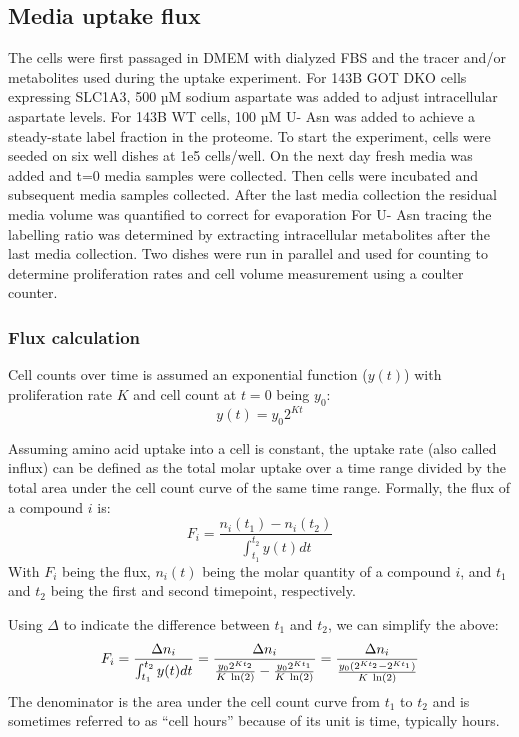 \subsection{Media uptake flux}
The cells were first passaged in DMEM with dialyzed FBS and the tracer and/or metabolites used during the uptake experiment.
For 143B GOT DKO cells expressing SLC1A3, 500 µM sodium aspartate was added to adjust intracellular aspartate levels.
For 143B WT cells, 100 µM U-\hCi{} Asn was added to achieve a steady-state label fraction in the proteome.
To start the experiment, cells were seeded on six well dishes at 1e5 cells/well.
On the next day fresh media was added and t=0 media samples were collected.
Then cells were incubated and subsequent media samples collected.
After the last media collection the residual media volume was quantified to correct for evaporation
For U-\hCi{} Asn tracing the labelling ratio was determined by extracting intracellular metabolites after the last media collection.
Two dishes were run in parallel and used for counting to determine proliferation rates and cell volume measurement using a coulter counter.

\subsubsection{Flux calculation}
Cell counts over time is assumed an exponential function ($y(t)$) with proliferation rate $K$ and cell count at $t=0$ being $y_0$:
\begin{equation}
    y(t) = y_0 2^{K t}
\end{equation}

Assuming amino acid uptake into a cell is constant, the uptake rate (also called influx) can be defined as the total molar uptake over a time range divided by the total area under the cell count curve of the same time range.
Formally, the flux of a compound $i$ is:
\begin{equation}
    F_i = \frac{n_i(t_1) - n_i(t_2)}{\int_{t_1}^{t_2} y(t) dt}
\end{equation}
With $F_i$ being the flux, $n_i(t)$ being the molar quantity of a compound $i$, and $t_1$ and $t_2$ being the first and second timepoint, respectively.

Using $\Delta$ to indicate the difference between $t_1$ and $t_2$, we can simplify the above:
\begin{equation}
    F_i = \frac{\Delta n_i}{\int_{t_1}^{t_2} y(t) dt} = \frac{\Delta n_i}{\frac{y_0 2^{K t_2}}{K\ \natlog(2)} - \frac{y_0 2^{K t_1}}{K\ \natlog(2)}} = \frac{\Delta n_i}{\frac{y_0 (2^{K t_2} - 2^{K t_1})}{K\ \natlog(2)}}
\end{equation}
The denominator is the area under the cell count curve from $t_1$ to $t_2$ and is sometimes referred to as ``cell hours'' because of its unit is time, typically hours.

